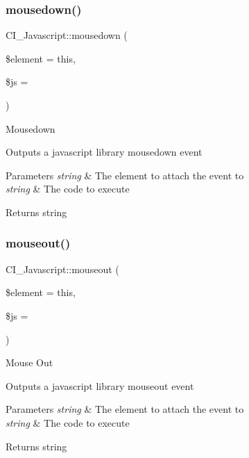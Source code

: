 \subsubsection{\texorpdfstring{mousedown()}{mousedown()}}
{\footnotesize\ttfamily C\+I\+\_\+\+Javascript\+::mousedown (\begin{DoxyParamCaption}\item[{}]{\$element = {\ttfamily \textquotesingle{}this\textquotesingle{}},  }\item[{}]{\$js = {\ttfamily \textquotesingle{}\textquotesingle{}} }\end{DoxyParamCaption})}

Mousedown

Outputs a javascript library mousedown event


\begin{DoxyParams}{Parameters}
{\em string} & The element to attach the event to \\
\hline
{\em string} & The code to execute \\
\hline
\end{DoxyParams}
\begin{DoxyReturn}{Returns}
string 
\end{DoxyReturn}
\mbox{\label{class_c_i___javascript_a2c5c075a2e381b8a963c093febadb81b}} 
\subsubsection{\texorpdfstring{mouseout()}{mouseout()}}
{\footnotesize\ttfamily C\+I\+\_\+\+Javascript\+::mouseout (\begin{DoxyParamCaption}\item[{}]{\$element = {\ttfamily \textquotesingle{}this\textquotesingle{}},  }\item[{}]{\$js = {\ttfamily \textquotesingle{}\textquotesingle{}} }\end{DoxyParamCaption})}

Mouse Out

Outputs a javascript library mouseout event


\begin{DoxyParams}{Parameters}
{\em string} & The element to attach the event to \\
\hline
{\em string} & The code to execute \\
\hline
\end{DoxyParams}
\begin{DoxyReturn}{Returns}
string 
\end{DoxyReturn}
\mbox{\label{class_c_i___javascript_a776db379fd9e0343780ad15f2cb5ea54}} 
